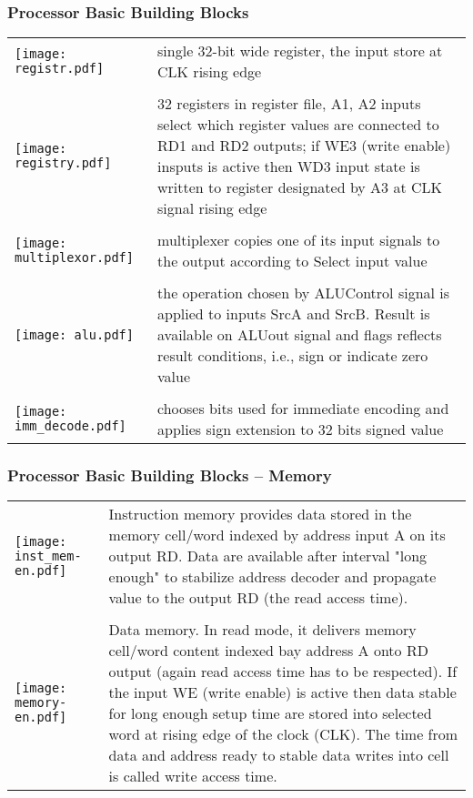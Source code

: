 \documentclass{beamer}
\begin{document}
\begin{frame}
\frametitle{Processor Basic Building Blocks}

\begin{table}
\footnotesize
\begin{tabular}{m{1.6cm} m{9.5cm}}
\hfill \texttt{[image: registr.pdf]} & single 32-bit wide register, the input store at CLK rising edge \\
\phantom{X} & \phantom{X} \\
\hfill \texttt{[image: registry.pdf]} & 32 registers in register file, A1, A2 inputs select which register values are connected to RD1 and RD2 outputs; if WE3 (write enable) insputs is active then WD3 input state is written to register designated by A3 at CLK signal rising edge \\
\phantom{X} & \phantom{X} \\
\hfill \texttt{[image: multiplexor.pdf]} & multiplexer copies one of its input signals to the output according to Select input value \\
\phantom{X} & \phantom{X} \\
\hfill \texttt{[image: alu.pdf]} & the operation chosen by ALUControl signal is applied to inputs SrcA and SrcB. Result is available on ALUout signal and flags reflects result conditions, i.e., sign or indicate zero value\\
\phantom{X} & \phantom{X} \\
\hfill \texttt{[image: imm\_decode.pdf]} & chooses bits used for immediate encoding and applies sign extension to 32 bits signed value \\
\end{tabular}
\end{table}

\end{frame}


\begin{frame}
\frametitle{Processor Basic Building Blocks -- Memory}

\begin{table}
\footnotesize
\begin{tabular}{m{2.2cm} m{9.0cm}}
\hfill \texttt{[image: inst\_mem-en.pdf]} & Instruction memory provides data stored in the memory cell/word indexed by address input A on its output RD. Data are available after interval "long enough" to stabilize address decoder and propagate value to the output RD (the read access time).\\
\phantom{X} & \phantom{X} \\
\hfill \texttt{[image: memory-en.pdf]} & Data memory. In read mode, it delivers memory cell/word content indexed bay address A onto RD output (again read access time has to be respected). If the input WE (write enable) is active then data stable for long enough setup time are stored into selected word at rising edge of the clock (CLK). The time from data and address ready to stable data writes into cell is called write access time.\\
\end{tabular}
\end{table}

\end{frame}
\end{document}
